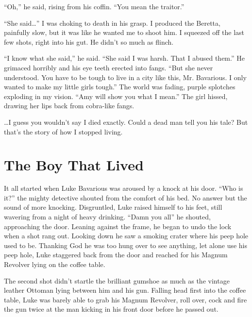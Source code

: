 ``Oh,'' he said, rising from his coffin. ``You mean
the traitor.''



``She said{\ldots}'' I was choking to death in his grasp.
I produced the Beretta, painfully slow, but it was like he wanted
me to shoot him. I squeezed off the last few shots, right into his
gut. He didn't so much as flinch.



``I know what she said,'' he said. ``She said I was
harsh. That I abused them.'' He grimaced horribly and his eye
teeth erected into fangs. ``But she never understood. You have
to be tough to live in a city like this, Mr. Bavarious. I only
wanted to make my little girls tough.'' The world was fading,
purple splotches exploding in my vision. ``Amy will show you
what I mean.'' The girl hissed, drawing her lips back from
cobra-like fangs.



{\ldots}I guess you wouldn't say I died exactly. Could a dead
man tell you his tale? But that's the story of how I stopped
living. 
 



\chapter{The Boy That Lived}





It all started when Luke Bavarious was aroused by a knock at his
door. ``Who is it?'' the mighty detective shouted from the comfort of
his bed. No answer but the sound of more knocking. Disgruntled,
Luke raised himself to his feet, still wavering from a night of
heavy drinking. ``Damn you all'' he shouted, approaching the door.
Leaning against the frame, he began to undo the lock when a shot
rang out. Looking down he saw a smoking crater where his peep hole
used to be. Thanking God he was too hung over to see anything, let
alone use his peep hole, Luke staggered back from the door and
reached for his Magnum Revolver lying on the coffee table.



The second shot didn't startle the brilliant gumshoe as much as the
vintage leather Ottoman lying between him and his gun. Falling head
first into the coffee table, Luke was barely able to grab his
Magnum Revolver, roll over, cock and fire the gun twice at the man
kicking in his front door before he passed out.



